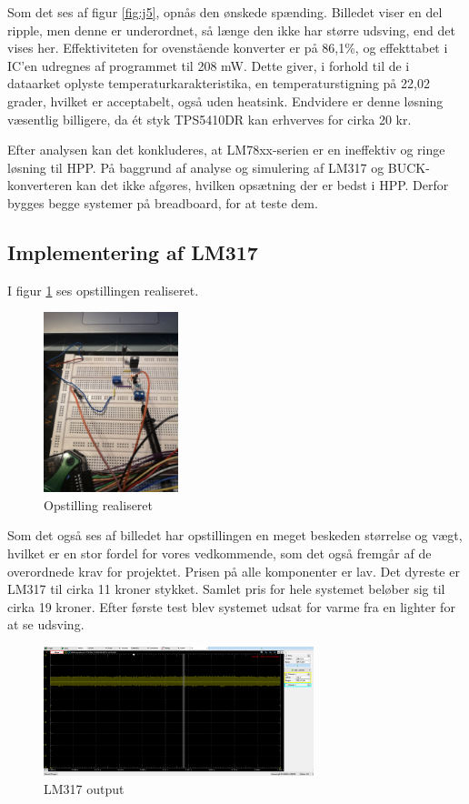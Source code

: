 Som det ses af figur \ref{fig:j5}, opnås den ønskede spænding. Billedet viser en del ripple, men denne er underordnet, så længe den ikke har større udsving, end det vises her. Effektiviteten for ovenstående konverter er på 86,1\%, og effekttabet i IC'en udregnes af programmet til 208 mW. Dette giver, i forhold til de i dataarket oplyste temperaturkarakteristika, en temperaturstigning på 22,02 grader, hvilket er acceptabelt, også uden heatsink. Endvidere er denne løsning væsentlig billigere, da ét styk TPS5410DR kan erhverves for cirka 20 kr.

Efter analysen kan det konkluderes, at LM78xx-serien er en ineffektiv og ringe løsning til HPP. På baggrund af analyse og simulering af LM317 og BUCK-konverteren kan det ikke afgøres, hvilken opsætning der er bedst i HPP. Derfor bygges begge systemer på breadboard, for at teste dem.

\subsection{Implementering af LM317}
\label{sec:impl-af-lm317}

I figur \ref{fig:j6} ses opstillingen realiseret. 
\clearpage
\begin{figure}[h]
  \centering
  \includegraphics[width=0.35\textwidth]{./figurer/j6.png}
  \caption{Opstilling realiseret}
  \label{fig:j6}
\end{figure}


Som det også ses af billedet har opstillingen en meget beskeden størrelse og vægt, hvilket er en stor fordel for vores vedkommende, som det også fremgår af de overordnede krav for projektet. Prisen på alle komponenter er lav. Det dyreste er LM317 til cirka 11 kroner stykket. Samlet pris for hele systemet beløber sig til cirka 19 kroner. Efter første test blev systemet udsat for varme fra en lighter for at se udsving.
\begin{figure}[h]
  \centering
  \includegraphics[width=0.7\textwidth]{./figurer/j7.png}
  \caption{LM317 output}
  \label{fig:j7}
\end{figure}

